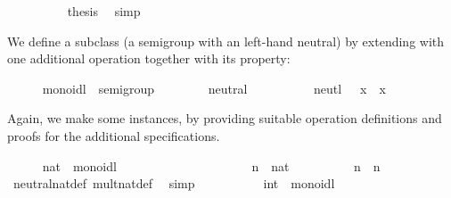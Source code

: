 \begin{isabellebody}
\ \ \ \ \ \ \ \ \isamarkupfalse%
\ {\isacharquery}thesis\ \isamarkupfalse%
\ simp\isanewline
\ \ \ \ \ \ \isamarkupfalse%
\isanewline
\ \ \ \ \isamarkupfalse%
%
\endisatagproof
{\isafoldproof}%
%
\isadelimproof
%
\endisadelimproof
%
\isamarkuptrue%
%
\begin{isamarkuptext}%
We define a subclass  (a semigroup with an left-hand neutral)
  by extending 
  with one additional operation  together
  with its property:%
\end{isamarkuptext}%
\isamarkuptrue%
\ \ \ \ \isamarkupfalse%
\ monoidl\ {\isacharequal}\ semigroup\ {\isacharplus}\isanewline
\ \ \ \ \ \ \ neutral\ {\isacharcolon}{\isacharcolon}\ {\isachardoublequoteopen}{\isasymalpha}{\isachardoublequoteclose}\ {\isacharparenleft}{\isachardoublequoteopen}\isactrlloc {\isasymone}{\isachardoublequoteclose}{\isacharparenright}\isanewline
\ \ \ \ \ \ \ neutl{\isacharcolon}\ {\isachardoublequoteopen}\isactrlloc {\isasymone}\ \isactrlloc {\isasymotimes}\ x\ {\isacharequal}\ x{\isachardoublequoteclose}%
\begin{isamarkuptext}%
\noindent Again, we make some instances, by
  providing suitable operation definitions and proofs for the
  additional specifications.%
\end{isamarkuptext}%
\isamarkuptrue%
\ \ \ \ \isamarkupfalse%
\ nat\ {\isacharcolon}{\isacharcolon}\ monoidl\isanewline
\ \ \ \ \ \ {\isachardoublequoteopen}{\isasymone}\ {\isasymequiv}\ {}{\isachardoublequoteclose}\isanewline
%
\isadelimproof
\ \ \ \ %
\endisadelimproof
%
\isatagproof
{}\isamarkupfalse%
\isanewline
\ \ \ \ \ \ \isamarkupfalse%
\ n\ {\isacharcolon}{\isacharcolon}\ nat\isanewline
\ \ \ \ \ \ \isamarkupfalse%
\ {\isachardoublequoteopen}{\isasymone}\ {\isasymotimes}\ n\ {\isacharequal}\ n{\isachardoublequoteclose}\ \isamarkupfalse%
\ neutral{\isacharunderscore}nat{\isacharunderscore}def\ mult{\isacharunderscore}nat{\isacharunderscore}def\ \isamarkupfalse%
\ simp\isanewline
\ \ \ \ \isamarkupfalse%
%
\endisatagproof
{\isafoldproof}%
%
\isadelimproof
\isanewline
%
\endisadelimproof
\isanewline
\ \ \ \ \isamarkupfalse%
\ int\ {\isacharcolon}{\isacharcolon}\ monoidl\isanewline
\ \ \ \ \ \ {\isachardoublequoteopen}{\isasymone}\ {\isasymequiv}\ {}{\isachardoublequoteclose}\isanewline

\end{isabellebody}
